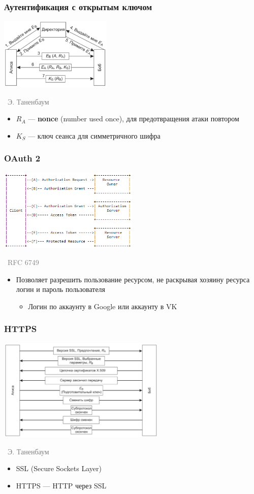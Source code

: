 \documentclass[xetex,mathserif,serif]{beamer}
\newcommand{\attribution}[1] {
\vspace{-5mm}\begin{flushright}\begin{scriptsize}\textcolor{gray}{\textcopyright\, #1}\end{scriptsize}\end{flushright}
}
\begin{document}
	\begin{frame}
		\frametitle{Аутентификация с открытым ключом}
		\begin{center}
			\includegraphics[width=0.4\textwidth]{authentication.png}
			\attribution{Э. Таненбаум}
		\end{center}
		\begin{itemize}
			\item $R_A$ --- \textbf{nonce} (number used once), для предотвращения атаки повтором
			\item $K_S$ --- ключ сеанса для симметричного шифра
		\end{itemize}
	\end{frame}

	\begin{frame}
		\frametitle{OAuth 2}
		\begin{center}
			\includegraphics[width=0.5\textwidth]{oauth.png}
			\attribution{RFC 6749}
		\end{center}
		\begin{itemize}
			\item Позволяет разрешить пользование ресурсом, не раскрывая хозяину ресурса логин и пароль пользователя
			\begin{itemize}
				\item Логин по аккаунту в Google или аккаунту в VK
			\end{itemize}
		\end{itemize}
	\end{frame}

	\begin{frame}
		\frametitle{HTTPS}
		\begin{center}
			\includegraphics[width=0.6\textwidth]{ssl.png}
			\attribution{Э. Таненбаум}
		\end{center}
		\begin{itemize}
			\item SSL (Secure Sockets Layer)
			\item HTTPS --- HTTP через SSL
		\end{itemize}
	\end{frame}
\end{document}
